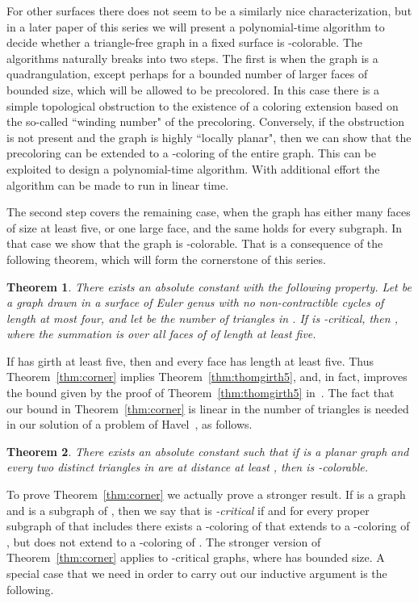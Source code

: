 \documentclass{article}
\def\mylabel#1{{\label{#1}}}
\newtheorem{theorem}{Theorem}
\begin{document}
For other surfaces there does not seem to be a similarly nice characterization,
but in a later paper of this series we will present a polynomial-time
algorithm to decide whether a triangle-free graph in a fixed surface
is -colorable.
The algorithms naturally breaks into two steps.
The first is when the graph is
a quadrangulation, except perhaps for a bounded number of larger faces
of bounded size, which will be allowed to be precolored.
In this case there is a simple topological obstruction to the existence
of a coloring extension based on the so-called ``winding number" of
the precoloring.
Conversely, if the obstruction is not present and the graph is highly
``locally planar", then we can show that the precoloring can be
extended to a -coloring of the entire graph.
This can be exploited to design a polynomial-time algorithm.
With additional effort the algorithm can be made to run in linear time.

The second step covers the remaining case, when the graph has either many faces
of size at least five, or one large face, and the same holds for every
subgraph.
In that case we show that the graph is -colorable.
That is a consequence of the following theorem, which will form the
cornerstone of this series.

\begin{theorem}
\mylabel{thm:corner}
There exists an absolute constant  with the following property.
Let  be a  graph drawn in a surface  of Euler genus 
with no non-contractible cycles of length at most four,  and let  be
the number of triangles in .
If  is -critical, 
then ,
where the summation is over all faces  of  of length at least five.
\end{theorem}

If  has girth at least five, then  and every face has length
at least five.
Thus Theorem~\ref{thm:corner} implies Theorem~\ref{thm:thomgirth5},
and, in fact, improves the bound given by the proof of 
Theorem~\ref{thm:thomgirth5} in~\cite{thom-surf}.
The fact that our bound in Theorem~\ref{thm:corner} is linear in the
number of triangles is needed in our solution of a problem of 
Havel~\cite{conj-havel}, as follows.

\begin{theorem}
\mylabel{havel}
There exists an absolute constant  such that if  is a planar
graph and every two distinct triangles in  are at distance at least ,
then  is -colorable.
\end{theorem}

To prove Theorem~\ref{thm:corner} we actually prove a stronger result.
If  is a graph and  is a subgraph of , then we say that 
is {\em -critical} if  and for every proper subgraph  of
 that includes  there exists a -coloring of  that extends to
a -coloring of , but does not extend to a -coloring of .
The stronger version of Theorem~\ref{thm:corner} applies to -critical
graphs, where  has bounded size.
A special case that we need in order to carry out our inductive argument
is the following.
\end{document}
